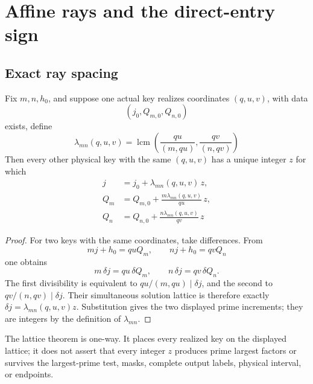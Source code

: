 \section{Affine rays and the direct-entry sign}
\label{sec:rays-signs}

\subsection{Exact ray spacing}

\begin{theorem}
\label{thm:direct-entry-ray}
Fix \(m,n,h_0\), and suppose one actual key realizes coordinates
\((q,u,v)\), with data
\[
 (j_0,Q_{m,0},Q_{n,0})
\]
exists, define
\begin{equation}
 \lambda_{mn}(q,u,v)
 =
 \operatorname{lcm}\left(
       \frac{qu}{(m,qu)},
       \frac{qv}{(n,qv)}
      \right)
 \label{eq:general-ray-spacing}
\end{equation}
Then every other physical key with the same \((q,u,v)\) has a unique
integer \(z\) for which
\begin{align}
 j&=j_0+\lambda_{mn}(q,u,v)\,z,
 \label{eq:direct-time-ray}\\
 Q_m&=Q_{m,0}+\frac{m\lambda_{mn}(q,u,v)}{qu}\,z,
 \label{eq:direct-Qm-ray}\\
 Q_n&=Q_{n,0}+\frac{n\lambda_{mn}(q,u,v)}{qv}\,z
 \label{eq:direct-Qn-ray}
\end{align}
\end{theorem}

\begin{proof}
For two keys with the same coordinates, take differences.  From
\[
 mj+h_0=quQ_m,\qquad nj+h_0=qvQ_n
\]
one obtains
\[
 m\,\delta j=qu\,\delta Q_m,\qquad
 n\,\delta j=qv\,\delta Q_n.
\]
The first divisibility is equivalent to
\(qu/(m,qu)\mid\delta j\), and the second to
\(qv/(n,qv)\mid\delta j\).  Their simultaneous solution lattice is
therefore exactly
\(\delta j=\lambda_{mn}(q,u,v)z\).  Substitution gives the two displayed
prime increments; they are integers by the definition of \(\lambda_{mn}\).
\end{proof}

\begin{remark}
The lattice theorem is one-way.  It places every realized key on the
displayed lattice; it does not assert that every integer \(z\) produces
prime largest factors or survives the largest-prime test, masks, complete
output labels, physical interval, or endpoints.
\end{remark}

